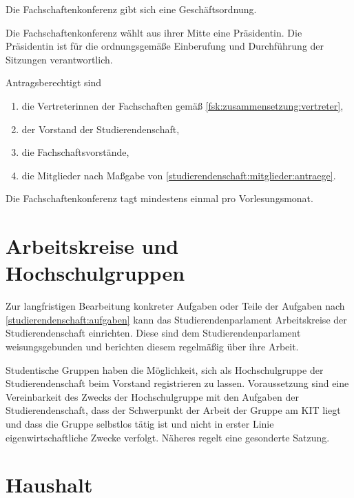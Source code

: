 \begin{contract}
Die Fachschaftenkonferenz gibt sich eine Geschäftsordnung.

Die Fachschaftenkonferenz wählt aus ihrer Mitte eine Präsidentin. Die Präsidentin ist für die ordnungsgemäße Einberufung und Durchführung der Sitzungen verantwortlich.

Antragsberechtigt sind
  \begin{enumerate}
  \item die Vertreterinnen der Fachschaften gemäß \ref{fsk:zusammensetzung:vertreter},
  \item der Vorstand der Studierendenschaft,
  \item die Fachschaftsvorstände,
  \item die Mitglieder nach Maßgabe von \ref{studierendenschaft:mitglieder:antraege}.
  \end{enumerate}

Die Fachschaftenkonferenz tagt mindestens einmal pro Vorlesungsmonat.

%
%

\parnumberfalse \section{Arbeitskreise und Hochschulgruppen} \parnumbertrue

\parnumberfalse Zur langfristigen Bearbeitung konkreter Aufgaben oder Teile der Aufgaben nach \ref{studierendenschaft:aufgaben} kann das Studierendenparlament Arbeitskreise der Studierendenschaft einrichten. Diese sind dem Studierendenparlament weisungsgebunden und berichten diesem regelmäßig über ihre Arbeit.\parnumbertrue

\parnumberfalse Studentische Gruppen haben die Möglichkeit, sich als Hochschulgruppe der Studierendenschaft beim Vorstand registrieren zu lassen. Voraussetzung sind eine Vereinbarkeit des Zwecks der Hochschulgruppe mit den Aufgaben der Studierendenschaft, dass der Schwerpunkt der Arbeit der Gruppe am KIT liegt und dass die Gruppe selbstlos tätig ist und nicht in erster Linie eigenwirtschaftliche Zwecke verfolgt. Näheres regelt eine gesonderte Satzung.\parnumbertrue

%
%

\parnumberfalse \section{Haushalt} \parnumbertrue


\end{contract}
